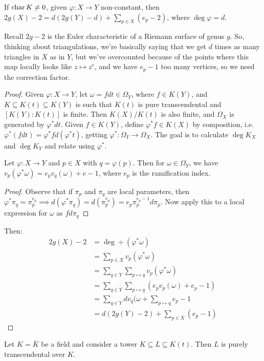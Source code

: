 \documentclass[10pt,a4paper,rgb]{article}
\begin{document}
\begin{theorem}
If $\operatorname{char} K \neq 0$, given $\varphi:X \to Y$ non-constant, then $2g(X) - 2 = d(2g(Y)-d) + \sum_{p\in X}(e_p-2)$, where $\deg \varphi = d$.
\end{theorem}
Recall $2g-2$ is the Euler characteristic of a Riemann surface of genus $g$. So, thinking about triangulations, we're basically saying that we get $d$ times as many triangles in $X$ as in $Y$, but we've overcounted because of the points where this map locally looks like $z\mapsto z^e$, and we have $e_p-1$ too many vertices, so we need the correction factor.
\begin{proof}
Given $\varphi:X \to Y$, let $\omega = f dt \in \Omega_Y$, where $f \in K(Y)$, and $K \subseteq K(t) \subseteq K(Y)$ is such that $K(t)$ is pure transcendental and $[K(Y):K(t)]$ is finite. Then $K(X)/K(t)$ is also finite, and $\Omega_X$ is generated by $\varphi^{\ast}dt$. Given $f \in K(Y)$, define $\varphi^\ast f \in K(X)$ by composition, i.e. $\varphi^\ast(fdt) = \varphi^{\ast}f d(\varphi^\ast t)$, getting $\varphi^\ast: \Omega_Y \to \Omega_X$. The goal is to calculate $\deg K_X$ and $\deg K_Y$ and relate using $\varphi^\ast$.

\begin{lemma}
Let $\varphi : X \to Y$ and $p \in X$ with $q = \varphi(p)$. Then for $\omega \in \Omega_Y$, we have $v_p(\varphi^\ast \omega) = e_pv_q(\omega) + e-1$, where $e_p$ is the ramification index.
\end{lemma}
\begin{proof}
Observe that if $\pi_p$ and $\pi_q$ are local parameters, then $\varphi^\ast \pi_q = \pi_p^{e_p}\implies d(\varphi^\ast \pi_q) = d(\pi_p^{e_p}) = e_p \pi_p^{e_p-1}d\pi_p$. Now apply this to a local expression for $\omega$ as $f d\pi_q$
\end{proof}
Then:
\begin{align*}
2g(X) - 2 &= \deg \div(\varphi^\ast \omega) \\&= \sum_{p\in X} v_p(\varphi^\ast\omega) \\&= \sum_{q \in Y}\sum_{p\mapsto q} v_p(\varphi^\ast\omega)\\
&= \sum_{q \in Y}\sum_{p \mapsto q}(e_pv_p(\omega) + e_p-1)\\
&= \sum_{q \in Y} dv_q(\omega + \sum_{p\mapsto q}e_p-1\\
&= d(2g(Y) - 2) + \sum_{p \in X}(e_p-1)
\end{align*}
\end{proof}
\begin{theorem}[Luroth]
Let $K = \bar{K}$ be a field and consider a tower $K \subseteq L \subseteq K(t)$. Then $L$ is purely transcendental over $K$.
\end{theorem}
\end{document}
